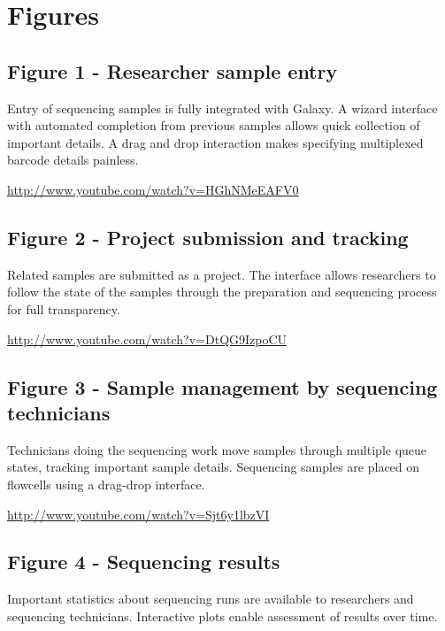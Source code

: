 \documentclass[10pt]{bmc_article}
\newenvironment{bmcformat}{\begin{raggedright}\baselineskip20pt\sloppy\setboolean{publ}{false}}{\end{raggedright}\baselineskip20pt\sloppy}
\begin{document}
\begin{bmcformat}

{
   }  %


\section*{Figures}
\subsection*{Figure 1 - Researcher sample entry}
Entry of sequencing samples is fully integrated with Galaxy. A
wizard interface with automated completion from previous samples
allows quick collection of important details. A drag and drop
interaction makes specifying multiplexed barcode details painless.

\url{http://www.youtube.com/watch?v=HGhNMeEAFV0}

\subsection*{Figure 2 - Project submission and tracking}
Related samples are submitted as a project. The interface allows
researchers to follow the state of the samples through the
preparation and sequencing process for full transparency.

\url{http://www.youtube.com/watch?v=DtQG9IzpoCU}

\subsection*{Figure 3 - Sample management by sequencing technicians}
Technicians doing the sequencing work move samples through multiple
queue states, tracking important sample details. Sequencing samples
are placed on flowcells using a drag-drop interface.

\url{http://www.youtube.com/watch?v=Sjt6y1lbzVI}

\subsection*{Figure 4 - Sequencing results}
Important statistics about sequencing runs are available to
researchers and sequencing technicians. Interactive plots enable
assessment of results over time.


\end{bmcformat}
\end{document}
